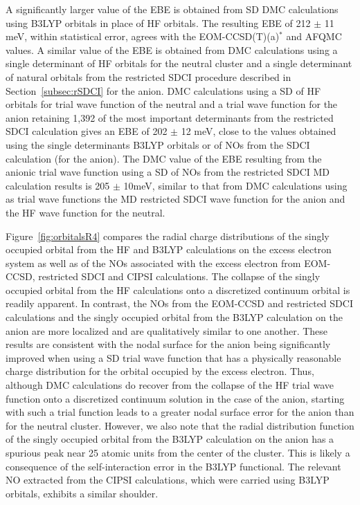 A significantly larger value of the EBE is obtained from SD DMC calculations using B3LYP orbitals in place of HF orbitals.
The resulting EBE of 212 $\pm$ 11 meV, within statistical error, agrees with the EOM-CCSD(T)(a)$^{*}$ and AFQMC values.
A similar value of the EBE is obtained from DMC calculations using a single determinant of HF orbitals for the neutral cluster and a single determinant of natural orbitals from the restricted SDCI procedure described in Section~\ref{subsec:rSDCI} for the anion.
DMC calculations using a SD of HF orbitals for trial wave function of the neutral and a trial wave function for the anion retaining 1,392 of the most important determinants from the restricted SDCI calculation gives an EBE of 202 $\pm$ 12 meV, close to the values obtained using the single determinants B3LYP orbitals or of NOs from the SDCI calculation (for the anion). 
The DMC value of the EBE resulting from the anionic trial wave function using a SD of NOs from the restricted SDCI MD calculation results is 205 $\pm$ 10meV, similar to that from DMC calculations using as trial wave functions the MD restricted SDCI wave function for the anion and the HF wave function for the neutral.

Figure~\ref{fig:orbitalsR4} compares the radial charge distributions of the singly occupied orbital from the HF and B3LYP calculations on the excess electron system as well as of the NOs associated with the excess electron from EOM-CCSD, restricted SDCI and CIPSI calculations. 
The collapse of the singly occupied orbital from the HF calculations onto a discretized continuum orbital is readily apparent. 
In contrast, the NOs from the EOM-CCSD and restricted SDCI calculations and the singly occupied orbital from the B3LYP calculation on the anion are more localized and are qualitatively similar to one another. 
These results are consistent with the nodal surface for the anion being significantly improved when using a SD trial wave function that has a physically reasonable charge distribution for the orbital occupied by the excess electron.
Thus, although DMC calculations do recover from the collapse of the HF trial wave function onto a discretized continuum solution in the case of the anion, starting with such a trial function leads to a greater nodal surface error for the anion than for the neutral cluster.
However, we also note that the radial distribution function of the singly occupied orbital from the B3LYP calculation on the anion has a spurious peak near 25 atomic units from the center of the cluster.
This is likely a consequence of the self-interaction error in the B3LYP functional.
The relevant NO extracted from the CIPSI calculations, which were carried using B3LYP orbitals, exhibits a similar shoulder.


